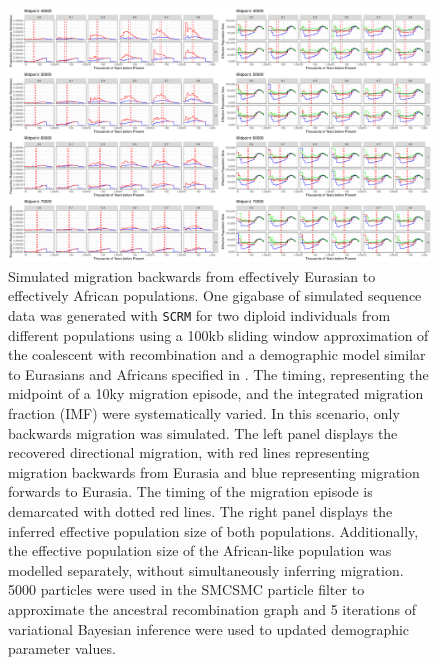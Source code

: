 \begin{figure}
	\centering
	\includegraphics[width=\textwidth]{plot/backward_different_starts.pdf}
	\caption[Simulated migration backwards from effectively Eurasian to effectively African populations]{Simulated migration backwards from effectively Eurasian to effectively African populations. One gigabase of simulated sequence data was generated with {\tt SCRM} for two diploid individuals from different populations using a 100kb sliding window approximation of the coalescent with recombination and a demographic model similar to Eurasians and Africans specified in . The timing, representing the midpoint of a 10ky migration episode, and the integrated migration fraction (IMF) were systematically varied. In this scenario, only backwards migration was simulated. The left panel displays the recovered directional migration, with red lines representing migration backwards from Eurasia and blue representing migration forwards to Eurasia. The timing of the migration episode is demarcated with dotted red lines. The right panel displays the inferred effective population size of both populations. Additionally, the effective population size of the African-like population was modelled separately, without simultaneously inferring migration. 5000 particles were used in the SMCSMC particle filter to approximate the ancestral recombination graph and 5 iterations of variational Bayesian inference were used to updated demographic parameter values.}
	\label{fig:backsim}
\end{figure}

